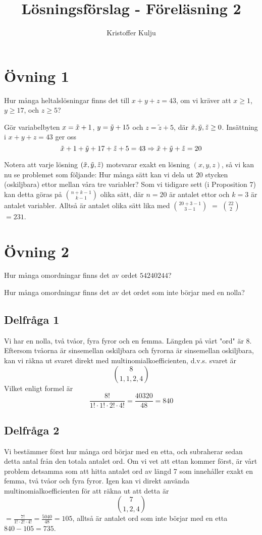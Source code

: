 \documentclass{article}
\title{Lösningsförslag - Föreläsning 2}
\author{Kristoffer Kulju}
\begin{document}
\maketitle

\section*{Övning 1}
\begin{xca}
  Hur många heltalslösningar finns det till $x + y + z = 43$, om vi kräver att $x \geq 1$, $y \geq 17$, och $z \geq 5$?
\end{xca}

Gör variabelbyten $x=\Tilde{x} + 1$, $y = \Tilde{y} + 15$ och $z=\tilde{z}+5$, där $\Tilde{x}, \Tilde{y}, \Tilde{z}\geq 0$. Insättning i $x+y+z=43$ ger oss $$
\Tilde{x} + 1 + \Tilde{y} + 17 + \Tilde{z} + 5 = 43 \Rightarrow  \Tilde{x} +  \Tilde{y} +  \Tilde{z}= 20
$$

Notera att varje lösning $(\Tilde{x}, \Tilde{y}, \Tilde{z})$ motsvarar exakt en lösning $(x, y, z)$, så vi kan nu se problemet som följande: Hur många sätt kan vi dela ut $20$ stycken (oskiljbara) ettor mellan våra tre variabler? Som vi tidigare sett (i Proposition 7) kan detta göras på $n + k - 1 \choose k - 1$ olika sätt, där $n=20$ är antalet ettor och $k=3$ är antalet variabler. Alltså är antalet olika sätt lika med $20 + 3 - 1 \choose 3 - 1$ $=$ $22 \choose 2$ $=231$. 

\section*{Övning 2}
\begin{xca}
  Hur många omordningar finns det av ordet $54240244$?

  Hur många omordningar finns det av det ordet som inte börjar med en nolla?
\end{xca}

\subsection*{Delfråga 1}
Vi har en nolla, två tvåor, fyra fyror och en femma. Längden på vårt "ord" är 8. Eftersom tvåorna är sinsemellan oskiljbara och fyrorna är sinsemellan oskiljbara, kan vi räkna ut svaret direkt med multinomialkoefficienten, d.v.s. svaret är $$
8 \choose 1, 1, 2, 4 
$$
Vilket enligt formel är $$
\frac{8!}{1!\cdot1!\cdot2!\cdot4!} = \frac{40320}{48}=840
$$
\subsection*{Delfråga 2}
Vi bestämmer först hur många ord börjar med en etta, och subraherar sedan detta antal från den totala antalet ord. Om vi vet att ettan kommer först, är vårt problem detsamma som att hitta antalet ord av längd 7 som innehåller exakt en femma, två tvåor och fyra fyror. Igen kan vi direkt använda multinomialkoefficienten för att räkna ut att detta är $$
7 \choose 1, 2, 4
$$
$=\frac{7!}{1!\cdot 2!\cdot 4!}=\frac{5040}{48}=105$, alltså är antalet ord som inte börjar med en etta $840-105=735$. 
\end{document}
